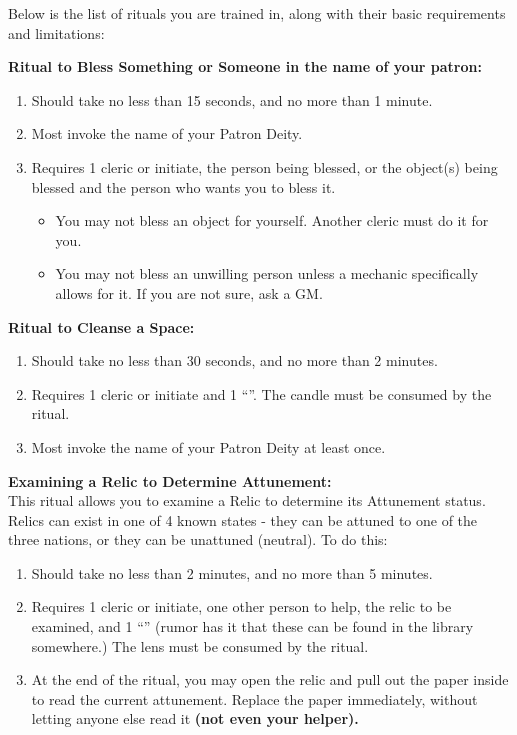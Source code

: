 \documentclass[green]{GL2020}
\begin{document}
Below is the list of rituals you are trained in, along with their basic requirements and limitations:

\textbf{Ritual to Bless Something or Someone in the name of your patron:}
  \begin{enumerate}
    \item Should take no less than 15 seconds, and no more than 1 minute.
    \item Most invoke the name of your Patron Deity.
    \item Requires 1 cleric or initiate, the person being blessed, or the object(s) being blessed and the person who wants you to bless it. 
    \begin{itemize}
      \item You may not bless an object for yourself. Another cleric must do it for you.
      \item You may not bless an unwilling person unless a mechanic specifically allows for it. If you are not sure, ask a GM.
    \end{itemize}
  \end{enumerate}

\textbf{Ritual to Cleanse a Space:}
  \begin{enumerate}
    \item Should take no less than 30 seconds, and no more than 2 minutes.
    \item Requires 1 cleric or initiate and 1 ``\iRitualCandle{}''. The candle must be consumed by the ritual.
    \item Most invoke the name of your Patron Deity at least once.
  \end{enumerate}
   
\textbf{Examining a Relic to Determine Attunement:}\\
This ritual allows you to examine a Relic to determine its Attunement status. Relics can exist in one of 4 known states - they can be attuned to one of the three nations, or they can be unattuned (neutral). To do this:
  \begin{enumerate}
    \item Should take no less than 2 minutes, and no more than 5 minutes.
    \item Requires 1 cleric or initiate, one other person to help, the relic to be examined, and 1 ``\iCrystalLens{}'' (rumor has it that these can be found in the library somewhere.) The lens must be consumed by the ritual. 
    \item At the end of the ritual, you may open the relic and pull out the paper inside to read the current attunement. Replace the paper immediately, without letting anyone else read it \textbf{(not even your helper).}
  \end{enumerate}
   
\end{document}
